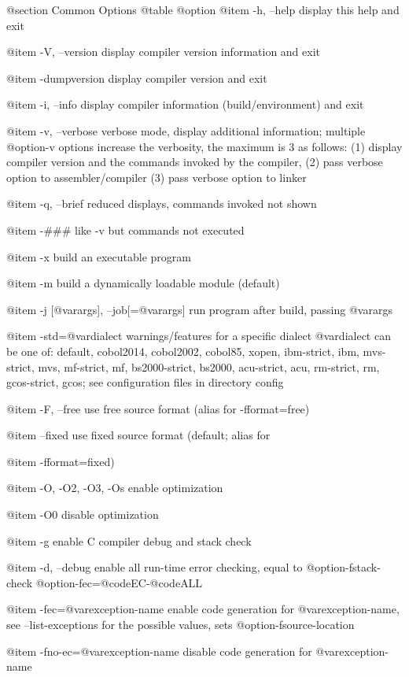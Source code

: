 @section Common Options
@table @option
@item -h, --help
display this help and exit

@item -V, --version
display compiler version information and exit

@item -dumpversion
display compiler version and exit

@item -i, --info
display compiler information (build/environment)
and exit

@item -v, --verbose
verbose mode, display additional information;
multiple @option{-v} options increase the verbosity,
the maximum is 3 as follows:
(1) display compiler version and the commands
invoked by the compiler,
(2) pass verbose option to assembler/compiler
(3) pass verbose option to linker

@item -q, --brief
reduced displays, commands invoked not shown

@item -###
like -v but commands not executed

@item -x
build an executable program

@item -m
build a dynamically loadable module (default)

@item -j [@var{args}], --job[=@var{args}]
run program after build, passing @var{args}

@item -std=@var{dialect}
warnings/features for a specific dialect
@var{dialect} can be one of:
default, cobol2014, cobol2002, cobol85, xopen,
ibm-strict, ibm, mvs-strict, mvs,
mf-strict, mf, bs2000-strict, bs2000,
acu-strict, acu, rm-strict, rm, gcos-strict,
gcos;
see configuration files in directory config

@item -F, --free
use free source format (alias for -fformat=free)

@item --fixed
use fixed source format (default; alias for

@item -fformat=fixed)

@item -O, -O2, -O3, -Os
enable optimization

@item -O0
disable optimization

@item -g
enable C compiler debug and stack check

@item -d, --debug
enable all run-time error checking,
equal to @option{-fstack-check} @option{-fec=}@code{EC}-@code{ALL}

@item -fec=@var{exception-name}
enable code generation for @var{exception-name},
see --list-exceptions for the possible values,
sets @option{-fsource-location}

@item -fno-ec=@var{exception-name}
disable code generation for @var{exception-name}

